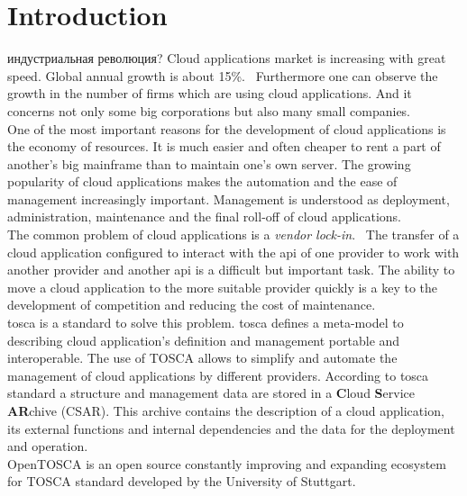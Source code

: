 
\chapter{Introduction}
индустриальная революция?
\fi
Cloud applications market is increasing with great speed. 
Global annual growth is about 15\%.~\cite*{statista_global}
Furthermore one can observe the growth in the number of firms which are using cloud applications. 
And it concerns not only some big corporations but also many small companies.~\cite*{destatis_2014, destatis_2016} \\ 
One of the most important reasons for the development of cloud applications is the economy of resources.
It is much easier and often cheaper to rent a part of another's big mainframe than to maintain one's own server.
The growing popularity of cloud applications makes the automation and the ease of management increasingly important.
Management is understood as deployment, administration, maintenance and the final roll-off of cloud applications.~\cite*{autocloud} \\   
The common problem of cloud applications is a \emph{vendor lock-in}.~\cite*{lockin} 
The transfer of a cloud application configured to interact with the \gls{api} of one provider to work with another provider and another \gls{api} is a difficult but important task. 
The ability to move a cloud application to the more suitable provider quickly is a key to the development of competition and reducing the cost of maintenance.\\ %
\gls{tosca} \cite*{TOSCA-v1.0} is a standard to solve this problem. 
\gls{tosca} defines a meta-model to describing cloud application's definition and management portable and interoperable. 
The use of TOSCA allows to simplify and automate the management of cloud applications by different providers. 
According to \gls{tosca} standard a structure and management data are stored in a \textbf{C}loud \textbf{S}ervice \textbf{AR}chive (CSAR).
This archive contains the description of a cloud application, its external functions and internal dependencies and the data for the deployment and operation.\\
OpenTOSCA \cite*{OpenTOSCA} is an open source constantly improving and expanding ecosystem for TOSCA standard developed by the University of Stuttgart.
